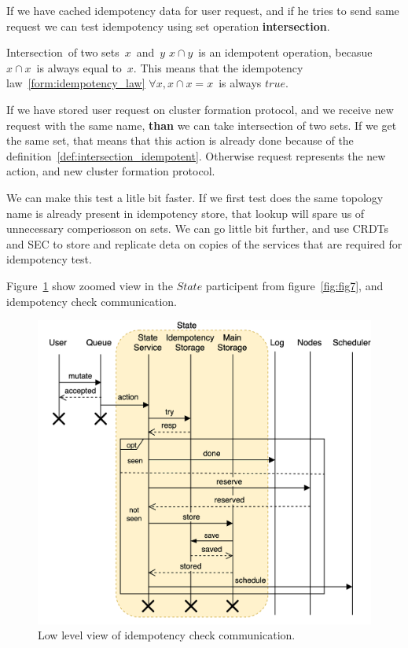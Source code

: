 If we have cached idempotency data for user request, and if he tries to send same request we can test idempotency using set operation \textbf{intersection}.

\begin{definition}\label{def:intersection_idempotent}
	Intersection of two sets $x$ and $y$ $x \cap y$ is an idempotent operation, becasue $x \cap x$ is always equal to $x$. This means that the idempotency law~\ref{form:idempotency_law} $\forall x, x \cap x = x$ is always $true$.
\end{definition}

If we have stored user request on cluster formation protocol, and we receive new request with the same name, \textbf{than} we can take intersection of two sets. If we get the same set, that means that this action is already done because of the definition~\ref{def:intersection_idempotent}. Otherwise request represents the new action, and new cluster formation protocol. 

We can make this test a litle bit faster. If we first test does the same topology name is already present in idempotency store, that lookup will spare us of unnecessary comperiosson on sets.
We can go little bit further, and use CRDTs and SEC to store and replicate deta on copies of the services that are required for idempotency test.

Figure~\ref{fig:fig13} show zoomed view in the $State$ participent from figure~\ref{fig:fig7}, and idempotency check communication.

\begin{figure}[H]
	\begin{center}
		\includegraphics[scale=0.7]{images/Figure13}
	\end{center}
	\vspace{-0.7cm}
	\caption{Low level view of idempotency check communication.}
	\label{fig:fig13}
\end{figure}

